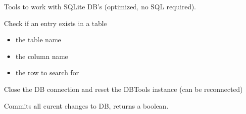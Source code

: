 \documentclass[letterpaper,10pt,english]{sphinxmanual}
\begin{document}
\begin{fulllineitems}
\label{\detokenize{modules_doc:cbmpy.CBNetDB.DBTools}}
\pysigstartsignatures
{}
\pysigstopsignatures
\sphinxAtStartPar
Tools to work with SQLite DB’s (optimized, no SQL required).

\begin{fulllineitems}
\label{\detokenize{modules_doc:cbmpy.CBNetDB.DBTools.checkEntryInColumn}}
\pysigstartsignatures
{}
\pysigstopsignatures
\sphinxAtStartPar
Check if an entry exists in a table
\begin{itemize}
\item {} 
\sphinxAtStartPar
{} the table name

\item {} 
\sphinxAtStartPar
{} the column name

\item {} 
\sphinxAtStartPar
{} the row to search for

\end{itemize}

\end{fulllineitems}


\begin{fulllineitems}
\label{\detokenize{modules_doc:cbmpy.CBNetDB.DBTools.closeDB}}
\pysigstartsignatures
{}
\pysigstopsignatures
\sphinxAtStartPar
Close the DB connection and reset the DBTools instance (can be reconnected)

\end{fulllineitems}


\begin{fulllineitems}
\label{\detokenize{modules_doc:cbmpy.CBNetDB.DBTools.commitDB}}
\pysigstartsignatures
{}
\pysigstopsignatures
\sphinxAtStartPar
Commits all curent changes to DB, returns a boolean.


\end{fulllineitems}
\end{fulllineitems}
\end{document}
